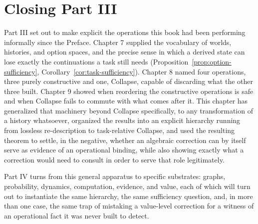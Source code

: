 \documentclass[11pt]{book}
\begin{document}
\section{Closing Part III}

Part III set out to make explicit the operations this book had been performing informally since the Preface. Chapter 7 supplied the vocabulary of worlds, histories, and option spaces, and the precise sense in which a derived state can lose exactly the continuations a task still needs (Proposition~\ref{prop:option-sufficiency}, Corollary~\ref{cor:task-sufficiency}). Chapter 8 named four operations, three purely constructive and one, Collapse, capable of discarding what the other three built. Chapter 9 showed when reordering the constructive operations is safe and when Collapse fails to commute with what comes after it. This chapter has generalized that machinery beyond Collapse specifically, to any transformation of a history whatsoever, organized the results into an explicit hierarchy running from lossless re-description to task-relative Collapse, and used the resulting theorem to settle, in the negative, whether an algebraic correction can by itself serve as evidence of an operational binding, while also showing exactly what a correction would need to consult in order to serve that role legitimately.

Part IV turns from this general apparatus to specific substrates: graphs, probability, dynamics, computation, evidence, and value, each of which will turn out to instantiate the same hierarchy, the same sufficiency question, and, in more than one case, the same trap of mistaking a value-level correction for a witness of an operational fact it was never built to detect.
\end{document}
